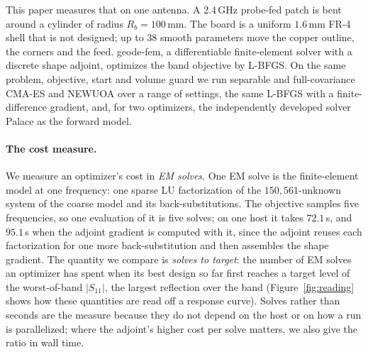 \documentclass{anvil-paper}
\begin{document}
This paper measures that on one antenna. A 2.4\,GHz probe-fed patch is bent
around a cylinder of radius $R_b = 100$\,mm. The board is a uniform
$1.6$\,mm FR-4 shell that is not designed; up to 38 smooth parameters move
the copper outline, the corners and the feed. geode-fem, a differentiable
finite-element solver with a discrete shape adjoint, optimizes the band
objective by L-BFGS. On the same problem, objective, start and volume guard
we run separable and full-covariance CMA-ES
\citep{hansen2001cmaes,ros2008separable} and NEWUOA
\citep{powell2006newuoa,zhang2023prima} over a range of settings, the same
L-BFGS with a finite-difference gradient, and, for two optimizers, the
independently developed solver Palace \citep{palace} as the forward model.

\paragraph{The cost measure.}
We measure an optimizer's cost in \emph{EM solves}. One EM solve is the
finite-element model at one frequency: one sparse LU factorization of the
$150{,}561$-unknown system of the coarse model and its back-substitutions.
The objective samples five frequencies, so one evaluation of it is five
solves; on one host it takes $72.1$\,s, and $95.1$\,s when the adjoint
gradient is computed with it, since the adjoint reuses each factorization for
one more back-substitution and then assembles the shape gradient. The quantity we compare is \emph{solves to
target}: the number of EM solves an optimizer has spent when its best design
so far first reaches a target level of the worst-of-band $|S_{11}|$, the
largest reflection over the band (Figure~\ref{fig:reading} shows how these
quantities are read off a response curve). Solves rather than seconds are the
measure because they do not depend on the host or on how a run is
parallelized; where the adjoint's higher cost per solve matters, we also
give the ratio in wall time.
\end{document}
